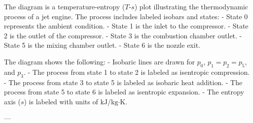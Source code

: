 The diagram is a temperature-entropy (\( T \)-\( s \)) plot illustrating the thermodynamic process of a jet engine. The process includes labeled isobars and states:  
- State 0 represents the ambient condition.  
- State 1 is the inlet to the compressor.  
- State 2 is the outlet of the compressor.  
- State 3 is the combustion chamber outlet.  
- State 5 is the mixing chamber outlet.  
- State 6 is the nozzle exit.  

The diagram shows the following:  
- Isobaric lines are drawn for \( p_0 \), \( p_1 = p_2 = p_5 \), and \( p_3 \).  
- The process from state 1 to state 2 is labeled as isentropic compression.  
- The process from state 3 to state 5 is labeled as isobaric heat addition.  
- The process from state 5 to state 6 is labeled as isentropic expansion.  
- The entropy axis (\( s \)) is labeled with units of \( \text{kJ/kg·K} \).  

---